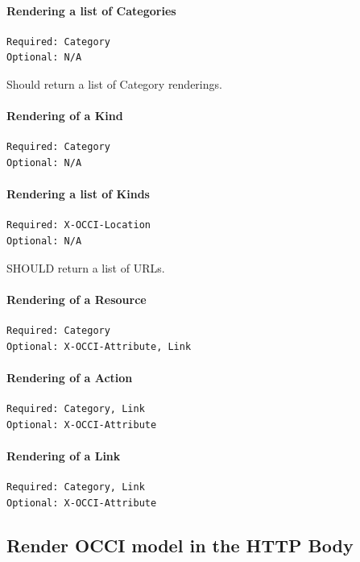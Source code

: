 \documentclass[10pt,a4paper]{article}
\begin{document}
\paragraph{Rendering a list of Categories}
\begin{verbatim}
Required: Category
Optional: N/A
\end{verbatim}
Should return a list of Category renderings.

\paragraph{Rendering of a Kind}
\begin{verbatim}
Required: Category
Optional: N/A
\end{verbatim}

\paragraph{Rendering a list of Kinds}
\begin{verbatim}
Required: X-OCCI-Location
Optional: N/A
\end{verbatim}
SHOULD return a list of URLs.

\paragraph{Rendering of a Resource}
\begin{verbatim}
Required: Category
Optional: X-OCCI-Attribute, Link
\end{verbatim}

\paragraph{Rendering of a Action}
\begin{verbatim}
Required: Category, Link
Optional: X-OCCI-Attribute
\end{verbatim}

\paragraph{Rendering of a Link}
\begin{verbatim}
Required: Category, Link
Optional: X-OCCI-Attribute
\end{verbatim}

\subsection{Render OCCI model in the HTTP Body}
\label{sec:http_body}
\end{document}
